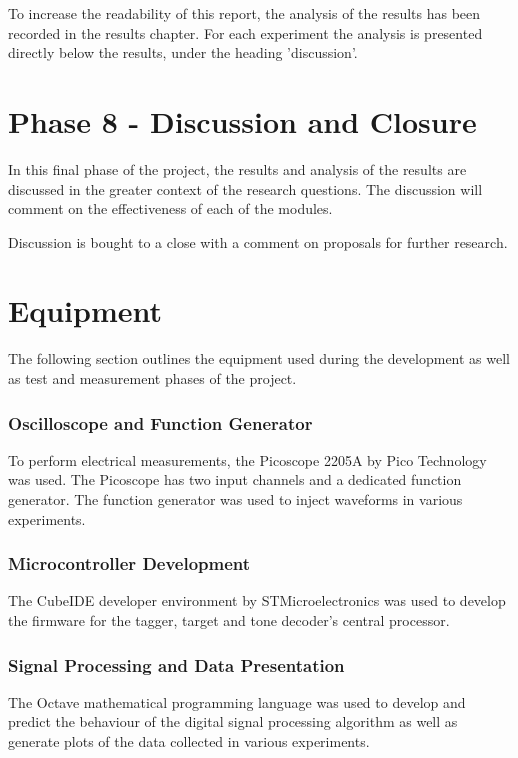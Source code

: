 To increase the readability of this report, the analysis of the results has been recorded in the results chapter. For each experiment the analysis is presented directly below the results, under the heading 'discussion'.



\section{Phase 8 - Discussion and Closure}

In this final phase of the project, the results and analysis of the results are discussed in the greater context of the research questions. The discussion will comment on the effectiveness of each of the modules. 

Discussion is bought to a close with a comment on proposals for further research.




\section{Equipment}
\label{sec:test_and_measurement_equipment}
The following section outlines the equipment used during the development as well as test and measurement phases of the project.

\subsubsection{Oscilloscope and Function Generator}
To perform electrical measurements, the Picoscope 2205A by Pico Technology was used. The Picoscope has two input channels and a dedicated function generator. The function generator was used to inject waveforms in various experiments.

\subsubsection{Microcontroller Development}
The CubeIDE developer environment by STMicroelectronics was used to develop the firmware for the tagger, target and tone decoder's central processor.

\subsubsection{Signal Processing and Data Presentation}
The Octave mathematical programming language was used to develop and predict the behaviour of the digital signal processing algorithm as well as generate plots of the data collected in various experiments.

